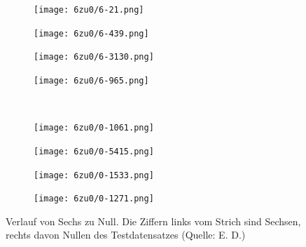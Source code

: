 \documentclass[a4paper,12pt,ngerman,oneside]{scrreprt}	%
\begin{document}
		\begin{figure}[H]
			\vspace{0.0cm} \centering
			\begin{subfigure}[h]{0.11\linewidth}
				\texttt{[image: 6zu0/6-21.png]}
			\end{subfigure}
			\begin{subfigure}[h]{0.11\linewidth}
				\texttt{[image: 6zu0/6-439.png]}
			\end{subfigure}
			\begin{subfigure}[h]{0.11\linewidth}
				\texttt{[image: 6zu0/6-3130.png]}
			\end{subfigure}
			\begin{subfigure}[h]{0.11\linewidth}
				\texttt{[image: 6zu0/6-965.png]}
			\end{subfigure}
			\unskip\ \vrule\ 
			\begin{subfigure}[h]{0.11\linewidth}
				\texttt{[image: 6zu0/0-1061.png]}
			\end{subfigure}
			\begin{subfigure}[h]{0.11\linewidth}
				\texttt{[image: 6zu0/0-5415.png]}
			\end{subfigure}
			\begin{subfigure}[h]{0.11\linewidth}
				\texttt{[image: 6zu0/0-1533.png]}
			\end{subfigure}
			\begin{subfigure}[h]{0.11\linewidth}
				\texttt{[image: 6zu0/0-1271.png]}
			\end{subfigure}
			\caption{Verlauf von Sechs zu Null. Die Ziffern links vom Strich sind Sechsen, rechts davon Nullen des Testdatensatzes (Quelle: E. D.)}\label{6zu0Beispiel}
		\end{figure}
		
\end{document}
